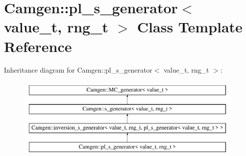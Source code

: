 \hypertarget{a00420}{\section{Camgen\-:\-:pl\-\_\-s\-\_\-generator$<$ value\-\_\-t, rng\-\_\-t $>$ Class Template Reference}
\label{a00420}
}
Inheritance diagram for Camgen\-:\-:pl\-\_\-s\-\_\-generator$<$ value\-\_\-t, rng\-\_\-t $>$\-:\begin{figure}[H]
\begin{center}
\leavevmode
\includegraphics[height=4.000000cm]{a00420}
\end{center}
\end{figure}
